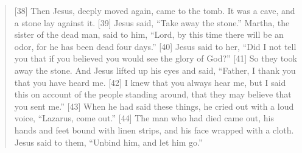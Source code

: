 \begin{quote}
    [38] Then Jesus, deeply moved again, came to the tomb. It was a cave, and a stone lay against it. [39] Jesus said, “Take away the stone.” Martha, the sister of the dead man, said to him, “Lord, by this time there will be an odor, for he has been dead four days.” [40] Jesus said to her, “Did I not tell you that if you believed you would see the glory of God?” [41] So they took away the stone. And Jesus lifted up his eyes and said, “Father, I thank you that you have heard me. [42] I knew that you always hear me, but I said this on account of the people standing around, that they may believe that you sent me.” [43] When he had said these things, he cried out with a loud voice, “Lazarus, come out.” [44] The man who had died came out, his hands and feet bound with linen strips, and his face wrapped with a cloth. Jesus said to them, “Unbind him, and let him go.”
  \end{quote}

